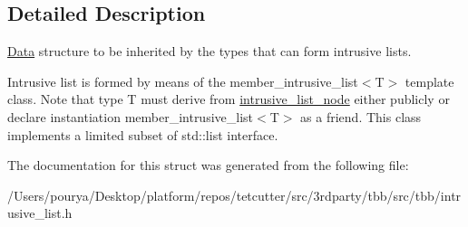 \subsection{Detailed Description}
\hyperlink{classData}{Data} structure to be inherited by the types that can form intrusive lists. 

Intrusive list is formed by means of the member\+\_\+intrusive\+\_\+list$<$\+T$>$ template class. Note that type T must derive from \hyperlink{structtbb_1_1internal_1_1intrusive__list__node}{intrusive\+\_\+list\+\_\+node} either publicly or declare instantiation member\+\_\+intrusive\+\_\+list$<$\+T$>$ as a friend. This class implements a limited subset of std\+::list interface. 

The documentation for this struct was generated from the following file\+:\begin{DoxyCompactItemize}
\item 
/\+Users/pourya/\+Desktop/platform/repos/tetcutter/src/3rdparty/tbb/src/tbb/intrusive\+\_\+list.\+h\end{DoxyCompactItemize}
